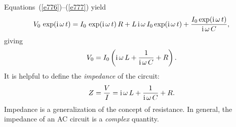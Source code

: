 Equations~(\ref{e776})--(\ref{e777}) yield
\begin{equation}
V_0\,  \exp({\rm i}\,\omega \,t) =I_0 \, \exp({\rm i}\,\omega \,t)\,
R+ L\, {\rm i}\,\omega \,I_0\exp({\rm i}\,\omega \,t)
+\frac{I_0 \exp({\rm i}\,\omega \,t)}{{\rm i}\,\omega\, C},
\end{equation}
giving
\begin{equation}
V_0 = I_0 \left({\rm i}\,\omega\, L + \frac{1}{{\rm i}\,\omega\, C} + R\right).
\end{equation}
It is helpful to define the {\em impedance} of the circuit:
\begin{equation}\label{e7.80}
Z = \frac{V}{I} = {\rm i}\,\omega\, L + \frac{1}{{\rm i }\, \omega \,C} + R.
\end{equation}
Impedance is a generalization of the concept of resistance. In general, the impedance
of an AC circuit is a {\em complex} quantity. 


